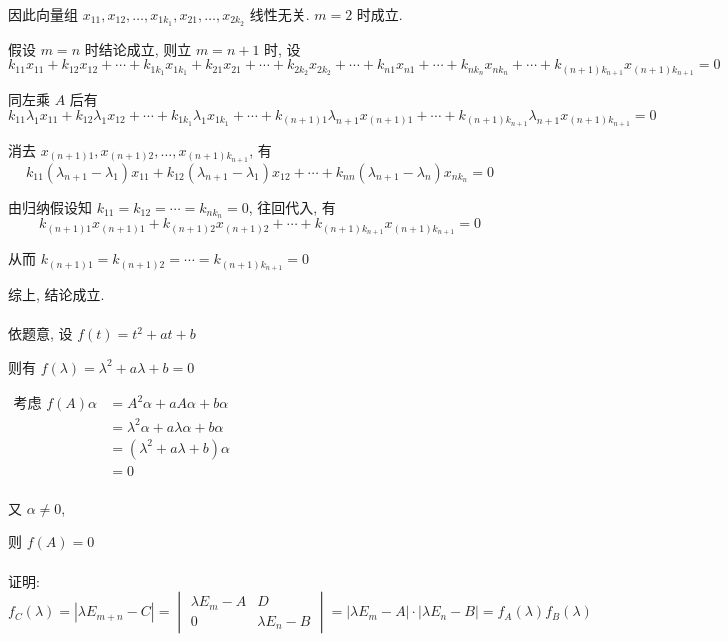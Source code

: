 		 因此向量组 \( x_{11}, x_{12}, \dots, x_{1k_{1}}, x_{21}, \dots, x_{2k_{2}} \) 线性无关. \( m=2 \) 时成立.

		 假设 \( m=n \) 时结论成立, 则立 \( m=n+1 \) 时, 设
		 \[ k_{11}x_{11} + k_{12}x_{12} + \cdots + k_{1k_{1}}x_{1k_{1}} + k_{21}x_{21} + \cdots + k_{2k_2}x_{2k_{2}} + \cdots + k_{n1}x_{n1} + \cdots + k_{n k_n}x_{n k_n} + \cdots + k_{(n+1)k_{n+1}}x_{(n+1)k_{n+1}} = 0 \]

		 同左乘 \( A \) 后有
		 \[ k_{11}\lambda_{1}x_{11} + k_{12}\lambda_{1}x_{12} + \cdots + k_{1k_{1}}\lambda_{1}x_{1k_{1}} + \cdots + k_{(n+1)1}\lambda_{n+1}x_{(n+1)1} + \cdots + k_{(n+1)k_{n+1}}\lambda_{n+1}x_{(n+1)k_{n+1}} = 0 \]

		 消去 \( x_{(n+1)1}, x_{(n+1)2}, \dots, x_{(n+1)k_{n+1}} \), 有
		 \[ k_{11}(\lambda_{n+1} - \lambda_{1})x_{11} + k_{12}(\lambda_{n+1} - \lambda_{1})x_{12} + \cdots + k_{nn}(\lambda_{n+1} - \lambda_{n})x_{nk_{n}} = 0 \]

		 由归纳假设知 \( k_{11} = k_{12} = \cdots = k_{n k_n} = 0 \), 往回代入, 有
		 \[ k_{(n+1)1}x_{(n+1)1} + k_{(n+1)2}x_{(n+1)2} + \cdots + k_{(n+1)k_{n+1}}x_{(n+1)k_{n+1}} = 0 \]

		 从而 \( k_{(n+1)1} = k_{(n+1)2} = \cdots = k_{(n+1)k_{n+1}} = 0 \)

		 综上, 结论成立.


	 \paragraph{} %
		 依题意, 设 \( f(t) = t^{2} + at + b \)

		 则有 \( f(\lambda) = \lambda^{2} + a\lambda + b = 0 \)

		 \(\begin{aligned}
			 \text{考虑 } f(A)\alpha & = A^{2}\alpha + aA\alpha + b\alpha             \\
			                       & = \lambda^{2}\alpha + a\lambda\alpha + b\alpha \\
			                       & = (\lambda^{2} + a\lambda + b)\alpha           \\
			                       & = 0                                            \\
		 \end{aligned}\)

		 又 \(\alpha \neq 0\),

		 则 \( f(A) = 0 \)

	 \paragraph{} %
		 证明: \( f_{C}(\lambda) = |\lambda E_{m+n} - C| = \begin{vmatrix}
			 \lambda E_{m} - A & D                 \\
			 0                 & \lambda E_{n} - B
		 \end{vmatrix} = |\lambda E_{m} - A|\cdot|\lambda E_{n} - B| = f_{A}(\lambda)f_{B}(\lambda) \)


